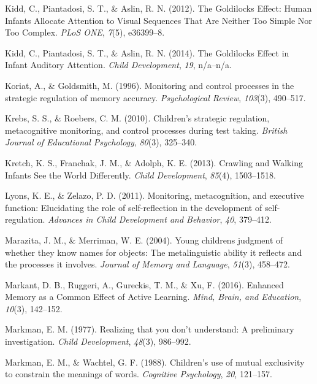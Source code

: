 \documentclass[english,,man]{apa6}
\begin{document}
\hypertarget{ref-Kidd2012}{}
Kidd, C., Piantadosi, S. T., \& Aslin, R. N. (2012). The Goldilocks
Effect: Human Infants Allocate Attention to Visual Sequences That Are
Neither Too Simple Nor Too Complex. \emph{PLoS ONE}, \emph{7}(5),
e36399--8.

\hypertarget{ref-Kidd2014}{}
Kidd, C., Piantadosi, S. T., \& Aslin, R. N. (2014). The Goldilocks
Effect in Infant Auditory Attention. \emph{Child Development},
\emph{19}, n/a--n/a.

\hypertarget{ref-Koriat1996}{}
Koriat, A., \& Goldsmith, M. (1996). Monitoring and control processes in
the strategic regulation of memory accuracy. \emph{Psychological
Review}, \emph{103}(3), 490--517.

\hypertarget{ref-Krebs2010}{}
Krebs, S. S., \& Roebers, C. M. (2010). Children's strategic regulation,
metacognitive monitoring, and control processes during test taking.
\emph{British Journal of Educational Psychology}, \emph{80}(3),
325--340.

\hypertarget{ref-Kretch2013}{}
Kretch, K. S., Franchak, J. M., \& Adolph, K. E. (2013). Crawling and
Walking Infants See the World Differently. \emph{Child Development},
\emph{85}(4), 1503--1518.

\hypertarget{ref-Lyons2011}{}
Lyons, K. E., \& Zelazo, P. D. (2011). Monitoring, metacognition, and
executive function: Elucidating the role of self-reflection in the
development of self-regulation. \emph{Advances in Child Development and
Behavior}, \emph{40}, 379--412.

\hypertarget{ref-Marazita2004}{}
Marazita, J. M., \& Merriman, W. E. (2004). Young childrens judgment of
whether they know names for objects: The metalinguistic ability it
reflects and the processes it involves. \emph{Journal of Memory and
Language}, \emph{51}(3), 458--472.

\hypertarget{ref-Markant2016}{}
Markant, D. B., Ruggeri, A., Gureckis, T. M., \& Xu, F. (2016). Enhanced
Memory as a Common Effect of Active Learning. \emph{Mind, Brain, and
Education}, \emph{10}(3), 142--152.

\hypertarget{ref-Markman1977}{}
Markman, E. M. (1977). Realizing that you don't understand: A
preliminary investigation. \emph{Child Development}, \emph{48}(3),
986--992.

\hypertarget{ref-Markman1988}{}
Markman, E. M., \& Wachtel, G. F. (1988). Children's use of mutual
exclusivity to constrain the meanings of words. \emph{Cognitive
Psychology}, \emph{20}, 121--157.
\end{document}
